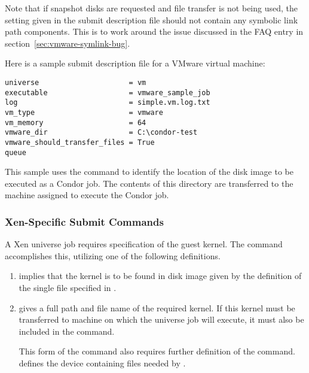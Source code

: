Note that if snapshot disks are requested and file transfer is not
being used, the  setting given in 
the submit description file
should not contain any symbolic link path components.
This is to work around the issue discussed
in the FAQ entry in section~\ref{sec:vmware-symlink-bug}.

Here is a sample submit description file for a VMware virtual machine:
\begin{verbatim}
universe                     = vm
executable                   = vmware_sample_job
log                          = simple.vm.log.txt
vm_type                      = vmware
vm_memory                    = 64
vmware_dir                   = C:\condor-test
vmware_should_transfer_files = True
queue
\end{verbatim}
This sample uses the  command to identify
the location of the disk image to be executed as a Condor job.
The contents of this directory are transferred to the machine assigned
to execute the Condor job.

\subsubsection{\label{sec:vm-Xensubmitfile}Xen-Specific Submit Commands}

A Xen  universe job requires specification of the
guest kernel. 
The  command accomplishes this, 
utilizing one of the following definitions.
\begin{enumerate}
\item {} implies that the kernel
  is to be found in disk image given by the definition of the single file
  specified in . 

\item {} gives a full path and
  file name of the required kernel.  If this kernel must be transferred
  to machine on which the  universe job will execute,
  it must also be included in the  command. 

  This form of the  command also requires further
  definition of the  command.
   defines the device containing files needed by
  .

\end{enumerate}

